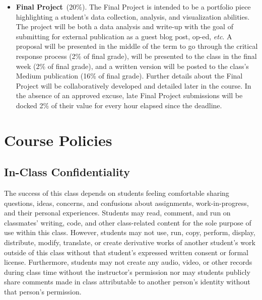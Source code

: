 \documentclass[10pt]{memoir}
\begin{document}
\begin{itemize}
    \item \textbf{Final Project}~(20\%). The Final Project is intended to be a portfolio piece highlighting a student's data collection, analysis, and visualization abilities. The project will be both a data analysis and write-up with the goal of submitting for external publication as a guest blog post, op-ed, \textit{etc}. A proposal will be presented in the middle of the term to go through the critical response process (2\% of final grade), will be presented to the class in the final week (2\% of final grade), and a written version will be posted to the class's Medium publication (16\% of final grade). Further details about the Final Project will be collaboratively developed and detailed later in the course. In the absence of an approved excuse, late Final Project submissions will be docked 2\% of their value for every hour elapsed since the deadline.
\end{itemize}

\section{Course Policies}


\subsection{In-Class Confidentiality}
The success of this class depends on students feeling comfortable sharing questions, ideas, concerns, and confusions about assignments, work-in-progress, and their personal experiences. Students may read, comment, and run on classmates' writing, code, and other class-related content for the sole purpose of use within this class. However, students may not use, run, copy, perform, display, distribute, modify, translate, or create derivative works of another student's work outside of this class without that student's expressed written consent or formal license. Furthermore, students may not create any audio, video, or other records during class time without the instructor's permission nor may students publicly share comments made in class attributable to another person's identity without that person's permission.
\end{document}
